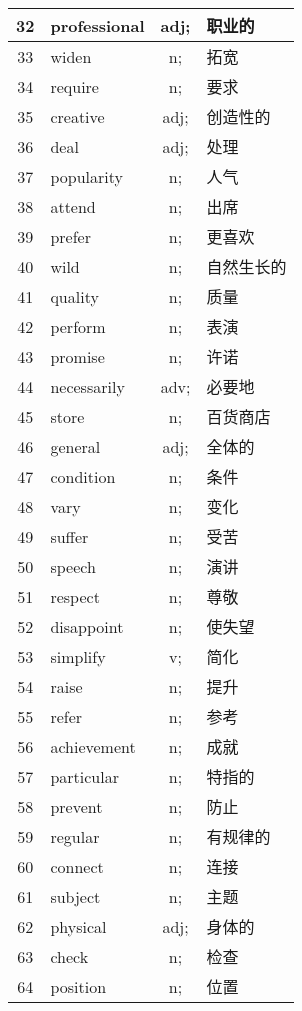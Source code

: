 \documentclass[UTF-8]{article}
\begin{document}
\begin{longtable}{c|p{6cm}|c|p{6cm}}
\hline        32& professional& adj;& 职业的 \\
\hline        33& widen& n;& 拓宽 \\
\hline        34& require& n;& 要求 \\
\hline        35& creative& adj;& 创造性的 \\
\hline        36& deal& adj;& 处理 \\
\hline        37& popularity& n;& 人气 \\
\hline        38& attend& n;& 出席 \\
\hline        39& prefer& n;& 更喜欢 \\
\hline        40& wild& n;& 自然生长的 \\
\hline        41& quality& n;& 质量 \\
\hline        42& perform& n;& 表演 \\
\hline        43& promise& n;& 许诺 \\
\hline        44& necessarily& adv;& 必要地 \\
\hline        45& store& n;& 百货商店 \\
\hline        46& general& adj;& 全体的 \\
\hline        47& condition& n;& 条件 \\
\hline        48& vary& n;& 变化 \\
\hline        49& suffer& n;& 受苦 \\
\hline        50& speech& n;& 演讲 \\
\hline        51& respect& n;& 尊敬 \\
\hline        52& disappoint& n;& 使失望 \\
\hline        53& simplify& v;& 简化 \\
\hline        54& raise& n;& 提升 \\
\hline        55& refer& n;& 参考 \\
\hline        56& achievement& n;& 成就 \\
\hline        57& particular& n;& 特指的 \\
\hline        58& prevent& n;& 防止 \\
\hline        59& regular& n;& 有规律的 \\
\hline        60& connect& n;& 连接 \\
\hline        61& subject& n;& 主题 \\
\hline        62& physical& adj;& 身体的 \\
\hline        63& check& n;& 检查 \\
\hline        64& position& n;& 位置 \\

\end{longtable}
\end{document}
